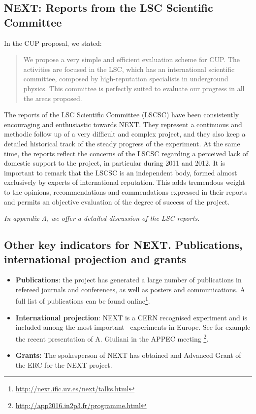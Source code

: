 
\subsection*{NEXT: Reports from the LSC Scientific Committee}

In the CUP proposal, we stated:
\begin{quotation}
We propose a very simple and efficient evaluation scheme for CUP. The  activities are focused in the LSC, which has an international scientific committee, composed by high-reputation specialists in underground physics. This committee is perfectly suited to evaluate our progress in all the areas proposed.
\end{quotation}

The reports of the LSC Scientific Committee (LSCSC) have been consistently encouraging and enthusiastic towards NEXT. They represent a continuous and methodic follow up of a very difficult and complex project, and they
also keep a detailed historical track of the steady progress of the experiment. At the same time, the reports reflect the concerns of the LSCSC regarding a perceived lack of domestic support to the project, in particular during 2011 and 2012.
It is important to remark that the LSCSC is an independent body, formed almost exclusively by experts of international reputation. This adds tremendous weight to the opinions, recommendations and commendations expressed in their reports and permits an objective evaluation of the degree of success of the project. 

{\em
In appendix A, we offer a detailed discussion of the LSC reports. 
}

\subsection*{Other key indicators for NEXT. Publications, international projection and grants}

\begin{itemize}
\item {\bf Publications}: the project has generated a large number of publications in refereed journals and conferences, as well as posters and communications. A full list of publications can be found online\footnote{\url{http://next.ific.uv.es/next/talks.html}}.
\item{\bf International projection}: NEXT is a CERN recognised experiment and is included among the most important
\bbonu\ experiments in Europe. See for example the recent presentation of A. Giuliani in the APPEC meeting \footnote{\url{http://app2016.in2p3.fr/programme.html}}.
\item{\bf Grants:} The spokesperson of NEXT has obtained and Advanced Grant of the ERC for the NEXT project. 
\end{itemize}

